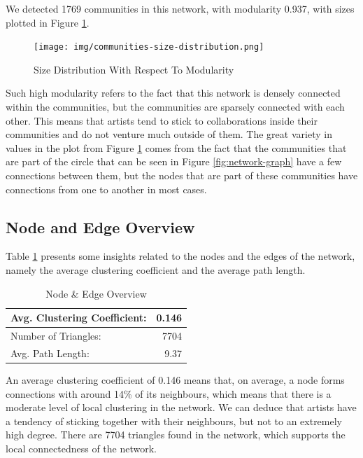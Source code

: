 \documentclass[sigchi]{acmart}
\begin{document}
We detected 1769 communities in this network, with modularity 0.937, with sizes plotted in Figure \ref{fig:modularity}.

\begin{figure}[h!]
  \centering
  \texttt{[image: img/communities-size-distribution.png]}
  \caption{Size Distribution With Respect To Modularity}
  \label{fig:modularity}
\end{figure}

Such high modularity refers to the fact that this network is densely connected within the communities, but the communities are sparsely connected with each other. This means that artists tend to stick to collaborations inside their communities and do not venture much outside of them. The great variety in values in the plot from Figure \ref{fig:modularity} comes from the fact that the communities that are part of the circle that can be seen in Figure \ref{fig:network-graph} have a few connections between them, but the nodes that are part of these communities have connections from one to another in most cases.

\subsection{Node and Edge Overview}

Table \ref{tab:node-edge-metrics} presents some insights related to the nodes and the edges of the network, namely the average clustering coefficient and the average path length.

\begin{table}[h!]
  \caption{Node \& Edge Overview}
  \label{tab:node-edge-metrics}
  \begin{tabular}{| l | r |}
    \hline
    Avg. Clustering Coefficient: &         0.146 \\
    \hline
    Number of Triangles: &                 7704 \\
    \hline
    Avg. Path Length: &                    9.37 \\
    \hline
\end{tabular}
\end{table}

An average clustering coefficient of 0.146 means that, on average, a node forms connections with around 14\% of its neighbours, which means that there is a moderate level of local clustering in the network. We can deduce that artists have a tendency of sticking together with their neighbours, but not to an extremely high degree. There are 7704 triangles found in the network, which supports the local connectedness of the network. 
\end{document}

